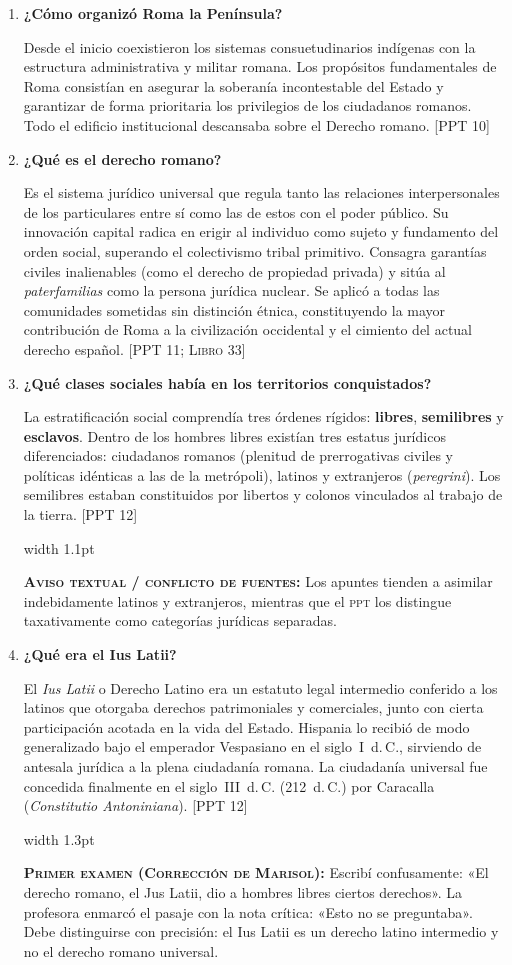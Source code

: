\documentclass[11pt,letterpaper]{article}
\newcommand{\fuente}[1]{\nolinebreak\hfill{\footnotesize\color{black!55}\textsc{[#1]}}}
\newcommand{\examen}[1]{%
  \par\vspace{0.35em}%
  \noindent\hspace*{0.8em}%
  {\color{goodingCrimson}\vrule width 1.3pt}\hspace{0.7em}%
  \parbox{\dimexpr\linewidth-2.2em}{%
    \footnotesize\color{goodingCrimson}%
    \textbf{\textsc{Primer examen (Corrección de Marisol):}} #1%
  }%
  \par\vspace{0.35em}%
}
\newcommand{\aviso}[1]{%
  \par\vspace{0.3em}%
  \noindent\hspace*{0.8em}%
  {\color{black!40}\vrule width 1.1pt}\hspace{0.7em}%
  \parbox{\dimexpr\linewidth-2.2em}{%
    \footnotesize\color{black!75}%
    \textbf{\textsc{Aviso textual / conflicto de fuentes:}} #1%
  }%
  \par\vspace{0.3em}%
}
\newcommand{\preg}[1]{\item \textbf{#1}\par\nopagebreak\vspace{0.2em}}
\begin{document}
\begin{enumerate}[resume]
  \preg{¿Cómo organizó Roma la Península?}
  Desde el inicio coexistieron los sistemas consuetudinarios indígenas con la estructura administrativa y militar romana. Los propósitos fundamentales de Roma consistían en asegurar la soberanía incontestable del Estado y garantizar de forma prioritaria los privilegios de los ciudadanos romanos. Todo el edificio institucional descansaba sobre el Derecho romano. \fuente{PPT 10}

  \preg{¿Qué es el derecho romano?}
  Es el sistema jurídico universal que regula tanto las relaciones interpersonales de los particulares entre sí como las de estos con el poder público. Su innovación capital radica en erigir al individuo como sujeto y fundamento del orden social, superando el colectivismo tribal primitivo. Consagra garantías civiles inalienables (como el derecho de propiedad privada) y sitúa al \emph{paterfamilias} como la persona jurídica nuclear. Se aplicó a todas las comunidades sometidas sin distinción étnica, constituyendo la mayor contribución de Roma a la civilización occidental y el cimiento del actual derecho español. \fuente{PPT 11; Libro 33}

  \preg{¿Qué clases sociales había en los territorios conquistados?}
  La estratificación social comprendía tres órdenes rígidos: \textbf{libres}, \textbf{semilibres} y \textbf{esclavos}. Dentro de los hombres libres existían tres estatus jurídicos diferenciados: ciudadanos romanos (plenitud de prerrogativas civiles y políticas idénticas a las de la metrópoli), latinos y extranjeros (\emph{peregrini}). Los semilibres estaban constituidos por libertos y colonos vinculados al trabajo de la tierra. \fuente{PPT 12}
  \aviso{Los apuntes tienden a asimilar indebidamente latinos y extranjeros, mientras que el \textsc{ppt} los distingue taxativamente como categorías jurídicas separadas.}

  \preg{¿Qué era el Ius Latii?}
  El \emph{Ius Latii} o Derecho Latino era un estatuto legal intermedio conferido a los latinos que otorgaba derechos patrimoniales y comerciales, junto con cierta participación acotada en la vida del Estado. Hispania lo recibió de modo generalizado bajo el emperador Vespasiano en el siglo~I~d.\,C., sirviendo de antesala jurídica a la plena ciudadanía romana. La ciudadanía universal fue concedida finalmente en el siglo~III~d.\,C. (212~d.\,C.) por Caracalla (\emph{Constitutio Antoniniana}). \fuente{PPT 12}
  \examen{Escribí confusamente: «El derecho romano, el Jus Latii, dio a hombres libres ciertos derechos». La profesora enmarcó el pasaje con la nota crítica: «Esto no se preguntaba». Debe distinguirse con precisión: el Ius Latii es un derecho latino intermedio y no el derecho romano universal.}


\end{enumerate}
\end{document}
